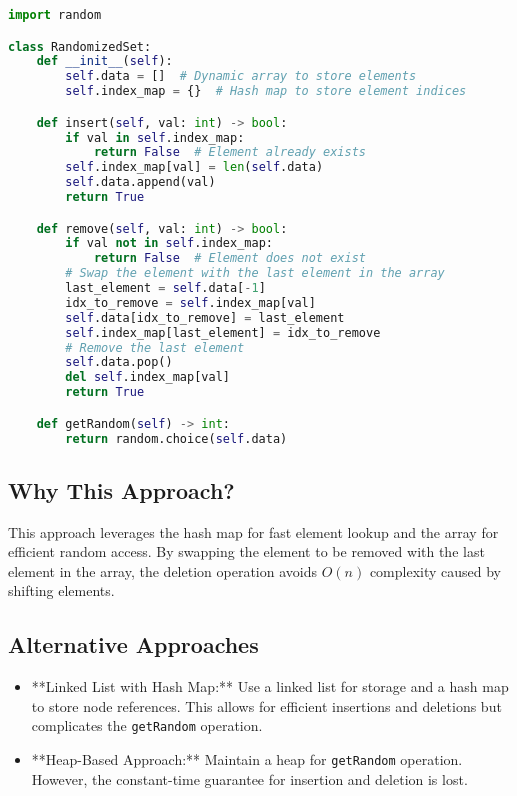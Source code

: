 \begin{fullwidth}
\begin{lstlisting}[language=Python]
import random

class RandomizedSet:
    def __init__(self):
        self.data = []  # Dynamic array to store elements
        self.index_map = {}  # Hash map to store element indices

    def insert(self, val: int) -> bool:
        if val in self.index_map:
            return False  # Element already exists
        self.index_map[val] = len(self.data)
        self.data.append(val)
        return True

    def remove(self, val: int) -> bool:
        if val not in self.index_map:
            return False  # Element does not exist
        # Swap the element with the last element in the array
        last_element = self.data[-1]
        idx_to_remove = self.index_map[val]
        self.data[idx_to_remove] = last_element
        self.index_map[last_element] = idx_to_remove
        # Remove the last element
        self.data.pop()
        del self.index_map[val]
        return True

    def getRandom(self) -> int:
        return random.choice(self.data)
\end{lstlisting}
\end{fullwidth}

\subsection*{Why This Approach?}
This approach leverages the hash map for fast element lookup and the array for efficient random access. By swapping the element to be removed with the last element in the array, the deletion operation avoids \(O(n)\) complexity caused by shifting elements.

\subsection*{Alternative Approaches}
\begin{itemize}
    \item **Linked List with Hash Map:**  
    Use a linked list for storage and a hash map to store node references. This allows for efficient insertions and deletions but complicates the \texttt{getRandom} operation.
    \item **Heap-Based Approach:**  
    Maintain a heap for \texttt{getRandom} operation. However, the constant-time guarantee for insertion and deletion is lost.
\end{itemize}

